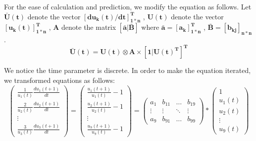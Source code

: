 \documentclass[12pt]{article}
\begin{document}
For the ease of calculation and prediction, we modify the equation as follows. Let $\bm{\bar U(t)}$ denote the vector $\bm{[du_{k}(t)/dt]^{T}_{1*n}}$  , $\bm{U(t)}$ denote the vector $\bm{[u_{k}(t)]^{T}_{1*n}}$  , $\bm{A}$ denote the matrix $\bm{[\bar a | {\bar B}]}$ where $\bm{{\bar a}=[a_{k}]^T_{1*n}}$  , $\bm{{\bar B}=[b_{kj}]_{n*n}}$.
\begin{equation}
	\bm {{\bar U(t)}=U(t)\otimes A \times [1 | U(t)^{T}]^{T}}
\end{equation}

We notice the time parameter is discrete. In order to make the equation iterated, we transformed equations as follows:
\begin{equation}
	\begin{pmatrix}
		\frac{1}{u_{1}(t)}\frac{du_{1}(t+1)}{dt} \\
		\frac{2}{u_{2}(t)}\frac{du_{2}(t+1)}{dt} \\
		\vdots \\
		\frac{3}{u_{3}(t)}\frac{du_{3}(t+1)}{dt}	
	\end{pmatrix}
	=
	\begin{pmatrix}
		\frac{u_{1}(t+1)}{u_{1}(t)} - 1 \\
		\frac{u_{2}(t+1)}{u_{2}(t)} - 1 \\
		\vdots \\
		\frac{u_{9}(t+1)}{u_{9}(t)} - 1
	\end{pmatrix}
	=
	\begin{pmatrix}
		a_{1} & b_{11} & \ldots & b_{19} \\
		\vdots & \vdots & \ddots & \vdots \\
		a_{9} & b_{91} & \ldots & b_{99}
	\end{pmatrix}
	\ast
	\begin{pmatrix}
		1 \\
		u_{1}(t) \\
		u_{2}(t) \\
		\vdots \\
		u_{9}(t)
	\end{pmatrix}
\end{equation}
\end{document}
